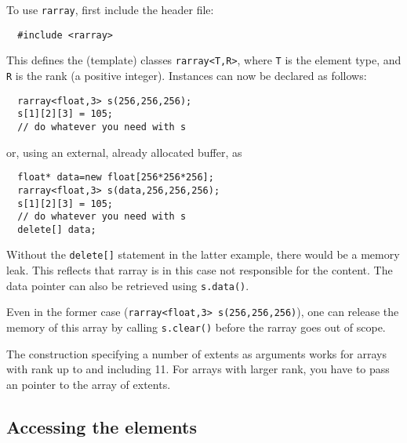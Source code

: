 \documentclass[11pt,twoside]{article}
\begin{document}
To use \texttt{rarray}, first include the header file:
\begin{framed}\vspace{-14pt}%
\begin{verbatim}
  #include <rarray>
\end{verbatim}%
\vspace{-14pt}
\end{framed}
This defines the (template) classes \texttt{rarray{\tt<}T,R{\tt>}}, where
\texttt T is the element type, and \texttt R is the
rank (a positive integer).  Instances can now be
declared as follows:
\begin{framed}\vspace{-18pt}%
\begin{verbatim}
  rarray<float,3> s(256,256,256);
  s[1][2][3] = 105;
  // do whatever you need with s
\end{verbatim}%
\vspace{-14pt}
\end{framed}
\noindent
or, using an external, already allocated buffer, as
\begin{framed}\vspace{-18pt}%
\begin{verbatim}
  float* data=new float[256*256*256];  
  rarray<float,3> s(data,256,256,256);
  s[1][2][3] = 105;
  // do whatever you need with s
  delete[] data;
\end{verbatim}%
\vspace{-14pt}
\end{framed}
Without the \texttt{delete[]} statement in the latter example, there would be a memory leak. This reflects that rarray is in this case not responsible
for the content. The data pointer can also be retrieved using
\texttt{s.data()}. 

Even in the former case (\texttt{rarray<float,3> s(256,256,256)}), one can release the memory of this array by calling \texttt{s.clear()} before the rarray goes out of scope.

The construction specifying a number of extents as arguments works for arrays with rank up to and including 11. For arrays with larger rank, you have to pass an pointer to the array of extents.

\subsection{Accessing the elements}
\end{document}
